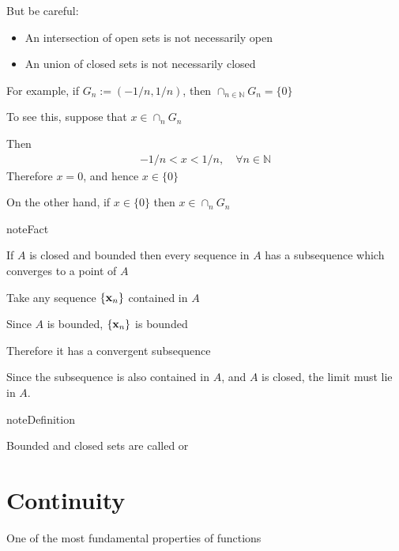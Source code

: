 \documentclass[letterpaper,10pt,english]{jupyterBook}
\begin{document}
\sphinxAtStartPar
But be careful:
\begin{itemize}
\item {} 
\sphinxAtStartPar
An  intersection of open sets is not necessarily open

\item {} 
\sphinxAtStartPar
An  union of closed sets is not necessarily closed

\end{itemize}

\sphinxAtStartPar
For example, if \(G_n := (-1/n, 1/n)\),  then \(\cap_{n \in \mathbb{N}} G_n = \{0\} \)

\sphinxAtStartPar
To see this, suppose that \(x \in \cap_n G_n\)

\sphinxAtStartPar
Then
\begin{equation*}
\begin{split}
-1/n < x < 1/n, \quad \forall n \in \mathbb{N}
\end{split}
\end{equation*}
\sphinxAtStartPar
Therefore \(x = 0\), and hence \(x \in \{0\}\)

\sphinxAtStartPar
On the other hand, if \(x \in \{0\}\) then \(x \in \cap_n G_n\)

\begin{sphinxadmonition}{note}{Fact}

\sphinxAtStartPar
If \(A\) is closed and bounded then every sequence in
\(A\) has a subsequence which converges to a point of \(A\)
\end{sphinxadmonition}

\sphinxAtStartPar
Take any sequence \(\{{\bf x}_n\}\) contained in \(A\)

\sphinxAtStartPar
Since \(A\) is bounded, \(\{{\bf x}_n\}\) is bounded

\sphinxAtStartPar
Therefore it has a convergent subsequence

\sphinxAtStartPar
Since the subsequence is also contained in \(A\),
and \(A\) is closed, the limit must lie in \(A\).

\begin{sphinxadmonition}{note}{Definition}

\sphinxAtStartPar
Bounded and closed sets are called  or 
\end{sphinxadmonition}


\section{Continuity}
\label{\detokenize{04.basic_analysis:continuity}}
\sphinxAtStartPar
One of the most fundamental properties of functions
\end{document}
